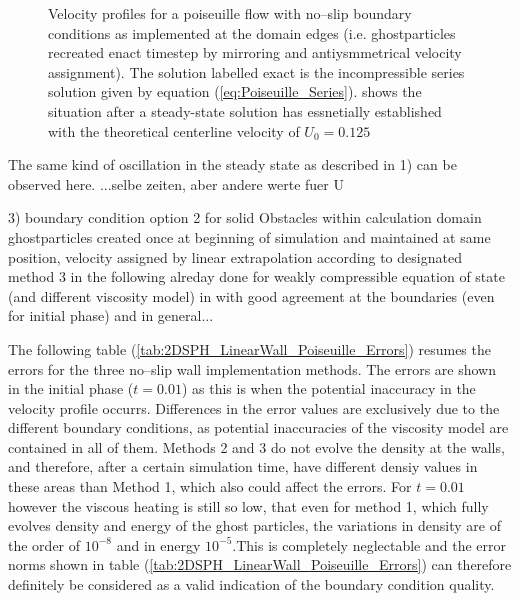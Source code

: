 \documentclass{report}
\begin{document}
\begin{figure}[!htbp]
\caption[Velocity profiles Poiseuille flow]{Velocity profiles for a poiseuille flow with no--slip boundary conditions as implemented at the domain edges (i.e. ghostparticles recreated enact timestep by mirroring and antiysmmetrical velocity assignment). The solution labelled exact is the incompressible series solution given by equation (\ref{eq:Poiseuille_Series}).   shows the situation after a steady-state solution has essnetially established with the theoretical centerline velocity of $U_0=0.125$}

\end{figure}





The same kind of oscillation in the steady state as described in 1) can be observed here. ...selbe zeiten, aber andere werte fuer U 


3) boundary condition option 2 for solid Obstacles within calculation domain
 ghostparticles created once at beginning of simulation and maintained at same position, velocity assigned by linear extrapolation according to \cite{Morris1009, Morris1999} designated method 3 in the following
alreday done for weakly compressible equation of state (and different viscosity model) in \cite{Morris1997} with good agreement at the boundaries (even for initial phase) and in general... 

The following table (\ref{tab:2DSPH_LinearWall_Poiseuille_Errors}) resumes the errors for the three no--slip wall implementation methods. The errors are shown in the initial phase ($t=0.01$) as this is when the potential inaccuracy in the velocity profile occurrs. Differences in the error values are exclusively due to the different boundary conditions, as potential inaccuracies of the viscosity model are contained in all of them. Methods 2 and 3 do not evolve the density at the walls, and therefore, after a certain simulation time, have different densiy values in these areas than Method 1, which also could affect the errors. For $t=0.01$ however the viscous heating is still so low, that even for method 1, which fully evolves density and energy of the ghost particles, the variations in density are of the order of $10^{-8}$ and in energy $10^{-5}$.This is completely neglectable and the error norms shown in table (\ref{tab:2DSPH_LinearWall_Poiseuille_Errors}) can therefore definitely be considered as a valid indication of the boundary condition quality.
 
\end{document}
